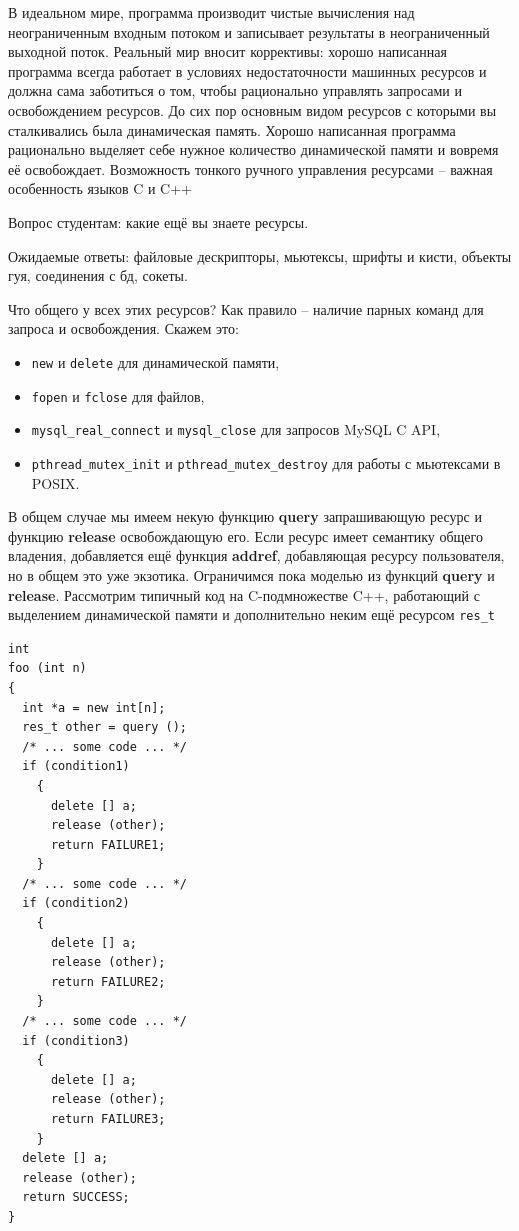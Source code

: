 \documentclass[a4paper,12pt,oneside]{article}
\begin{document}
В идеальном мире, программа производит чистые вычисления над неограниченным входным потоком и записывает результаты в неограниченный выходной поток. Реальный мир вносит коррективы: хорошо написанная программа всегда работает в условиях недостаточности машинных ресурсов и должна сама заботиться о том, чтобы рационально управлять запросами и освобождением ресурсов. До сих пор основным видом ресурсов с которыми вы сталкивались была динамическая память. Хорошо написанная программа рационально выделяет себе нужное количество динамической памяти и вовремя её освобождает. Возможность тонкого ручного управления ресурсами -- важная особенность языков C и C++

Вопрос студентам: какие ещё вы знаете ресурсы.

Ожидаемые ответы: файловые дескрипторы, мьютексы, шрифты и кисти, объекты гуя, соединения с бд, сокеты.

Что общего у всех этих ресурсов? Как правило -- наличие парных команд для запроса и освобождения. 
Скажем это: 
\begin{itemize}
\item
\lstinline!new! и \lstinline!delete! для динамической памяти, 
\item
\lstinline!fopen! и \lstinline!fclose! для файлов, 
\item
\lstinline!mysql_real_connect! и \lstinline!mysql_close! для запросов MySQL C API, 
\item
\lstinline!pthread_mutex_init! и \lstinline!pthread_mutex_destroy! для работы с мьютексами в POSIX. 
\end{itemize}

В общем случае мы имеем некую функцию \textbf{query} запрашивающую ресурс и функцию \textbf{release} освобождающую его. Если ресурс имеет семантику общего владения, добавляется ещё функция \textbf{addref}, добавляющая ресурсу пользователя, но в общем это уже экзотика. Ограничимся пока моделью из функций \textbf{query} и \textbf{release}. Рассмотрим типичный код на C-подмножестве C++, работающий с выделением динамической памяти и дополнительно неким ещё ресурсом \lstinline!res_t!

\begin{lstlisting}
int
foo (int n)
{
  int *a = new int[n];
  res_t other = query ();
  /* ... some code ... */
  if (condition1)
    {
      delete [] a;
      release (other);
      return FAILURE1;      
    }
  /* ... some code ... */
  if (condition2)
    {
      delete [] a;
      release (other);
      return FAILURE2; 
    }
  /* ... some code ... */
  if (condition3)
    {
      delete [] a;
      release (other);
      return FAILURE3;
    }
  delete [] a;
  release (other);
  return SUCCESS;
}

\end{lstlisting}
\end{document}
